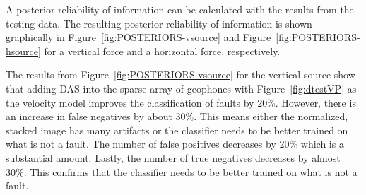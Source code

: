 %

A posterior reliability of information can be calculated with the results from the testing data. The resulting posterior reliability of information is shown graphically in Figure~\ref{fig:POSTERIORS-vsource} and Figure~\ref{fig:POSTERIORS-hsource} for a vertical force and a horizontal force, respectively.


The results from Figure~\ref{fig:POSTERIORS-vsource} for the vertical source show that adding DAS into the sparse array of geophones with Figure~\ref{fig:dtestVP} as the velocity model improves the classification of faults by 20\%. However, there is an increase in false negatives by about 30\%. This means either the normalized, stacked image has many artifacts or the classifier needs to be better trained on what is not a fault. The number of false positives decreases by 20\% which is a substantial amount. Lastly, the number of true negatives decreases by almost 30\%. This confirms that the classifier needs to be better trained on what is not a fault.

